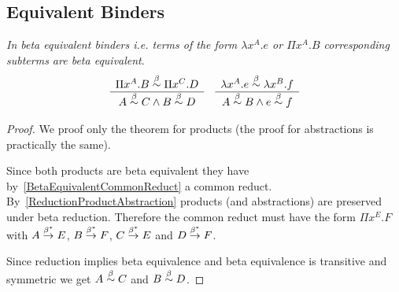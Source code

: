 \subsection{Equivalent Binders}

\begin{theorem}
    \emph{In beta equivalent binders i.e. terms of the form $\lambda x^A. e$ or
    $\Pi x^A.B$ corresponding subterms are beta equivalent}.
    $$
    \begin{array}{c} 
        \Pi x^A.B \stackrel{\beta}{\sim} \Pi x^C.D
     \\ \hline 
        A \stackrel{\beta}{\sim} C \land B \stackrel{\beta}{\sim} D
    \end{array}
    \quad
    \begin{array}{c} 
        \lambda x^A.e \stackrel{\beta}{\sim} \lambda x^B.f
     \\ \hline 
        A \stackrel{\beta}{\sim} B \land e \stackrel{\beta}{\sim} f
    \end{array}
    $$

    \begin{proof}
        We proof only the theorem for products (the proof for
        abstractions is practically the same).

        Since both products are beta equivalent they have
        by~\ref{BetaEquivalentCommonReduct} a common reduct.
        By~\ref{ReductionProductAbstraction} products (and abstractions) are
        preserved under beta reduction. Therefore the common reduct must have
        the form $\Pi x^E.F$ with $A \stackrel{\beta^*}{\to} E$, $B \stackrel{\beta^*}{\to} F$, $C
        \stackrel{\beta^*}{\to} E$ and $D \stackrel{\beta^*}{\to} F$.

        Since reduction implies beta equivalence and beta equivalence is
        transitive and symmetric we get $A \stackrel{\beta}{\sim} C$ and $B \stackrel{\beta}{\sim} D$.
    \end{proof}
\end{theorem}
